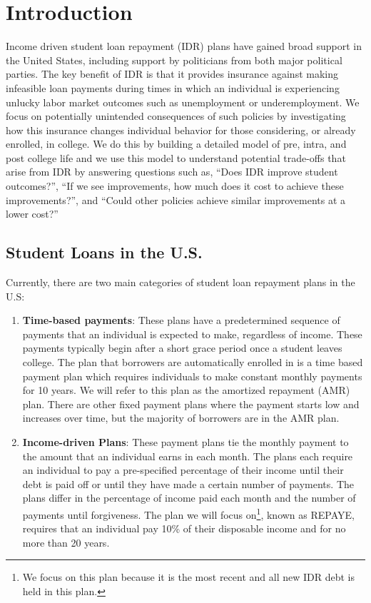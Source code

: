 
\section{Introduction} \label{sec:intro}

Income driven student loan repayment (IDR) plans have gained broad support in the United States,
including support by politicians from both major political parties. The key benefit of IDR is that
it provides insurance against making infeasible loan payments during times in which an individual is
experiencing unlucky labor market outcomes such as unemployment or underemployment. We focus on
potentially unintended consequences of such policies by investigating how this insurance changes
individual behavior for those considering, or already enrolled, in college. We do this by building a
detailed model of pre, intra, and post college life and we use this model to understand potential
trade-offs that arise from IDR by answering questions such as, ``Does IDR improve student
outcomes?'', ``If we see improvements, how much does it cost to achieve these improvements?'', and
``Could other policies achieve similar improvements at a lower cost?''


\subsection{Student Loans in the U.S.}

  Currently, there are two main categories of student loan repayment plans in the U.S:

  \begin{enumerate}
    \item \textbf{Time-based payments}: These plans have a predetermined sequence of payments that
    an individual is expected to make, regardless of income. These payments typically begin after
    a short grace period once a student leaves college. The plan that borrowers are automatically
    enrolled in is a time based payment plan which requires individuals to make constant monthly
    payments for 10 years. We will refer to this plan as the amortized repayment (AMR) plan. There
    are other fixed payment plans where the payment starts low and increases over time, but the
    majority of borrowers are in the AMR plan.
    \item \textbf{Income-driven Plans}: These payment plans tie the monthly payment to the amount
    that an individual earns in each month. The plans each require an individual to pay a
    pre-specified percentage of their income until their debt is paid off or until they have made a
    certain number of payments. The plans differ in the percentage of income paid each month and
    the number of payments until forgiveness. The plan we will focus on\footnote{We focus on this
    plan because it is the most recent and all new IDR debt is held in this plan.}, known as REPAYE,
    requires that an individual pay 10\% of their disposable income and for no more than 20 years.
  \end{enumerate}

